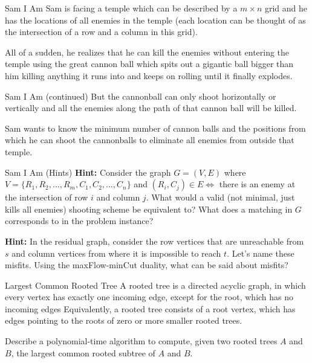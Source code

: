 \documentclass[aspectratio=169,11pt]{beamer}
\newcommand{\blankslides}{%
  \begin{frame}[plain]\end{frame}%
  \begin{frame}[plain]\end{frame}%
}
\begin{document}
\begin{frame}{Sam I Am}
Sam is facing a temple which can be described by a $m\times n$ grid and he has the locations of all enemies
in the temple (each location can be thought of as the intersection of a row and a column in this grid).

\medskip
All of a sudden, he realizes that he can kill the enemies without entering the temple using the great
cannon ball which spits out a gigantic ball bigger than him killing anything it runs into and keeps on
rolling until it finally explodes.
\end{frame}

\begin{frame}{Sam I Am (continued)}
But the cannonball can only shoot horizontally or vertically and all the enemies along the path of that
cannon ball will be killed.

\medskip
Sam wants to know the minimum number of cannon balls and the positions from which he can shoot the
cannonballs to eliminate all enemies from outside that temple.
\end{frame}

\begin{frame}{Sam I Am (Hints)}
\textbf{Hint:} Consider the graph $G=(V,E)$ where $V=\{R_1,R_2,\dots,R_m,C_1,C_2,\dots,C_n\}$ and
$(R_i,C_j)\in E\iff$ there is an enemy at the intersection of row $i$ and column $j$. What would a valid
(not minimal, just kills all enemies) shooting scheme be equivalent to? What does a matching in $G$
corresponds to in the problem instance?

\medskip
\textbf{Hint:} In the residual graph, consider the row vertices that are unreachable from $s$ and column
vertices from where it is impossible to reach $t$. Let's name these misfits. Using the
maxFlow-minCut duality, what can be said about misfits?
\end{frame}
\blankslides

\begin{frame}{Largest Common Rooted Tree}
A rooted tree is a directed acyclic graph, in which every vertex has exactly one incoming edge, except for
the root, which has no incoming edges Equivalently, a rooted tree consists of a root vertex, which has edges
pointing to the roots of zero or more smaller rooted trees.

\medskip
Describe a polynomial-time algorithm to compute, given two rooted trees $A$ and $B$, the largest common
rooted subtree of $A$ and $B$.
\end{frame}
\end{document}
